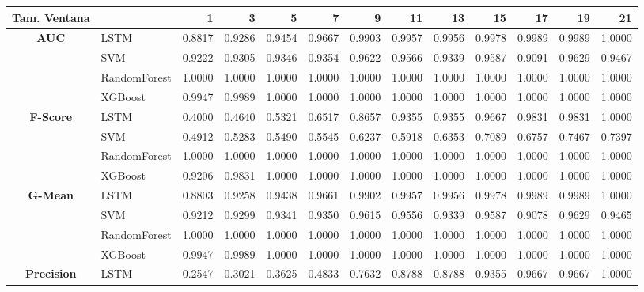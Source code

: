 \begin{table}[h]
\centering
\begin{adjustbox}{max width=15cm}
	\begin{tabular}{|c|l|r|r|r|r|r|r|r|r|r|r|r|}
		\hline
		\textbf{Tam. Ventana}&         &      1  &      3  &      5  &      7  &      9  &      11 &      13 &      15 &      17 &      19 &      21 \\
		\hline
		\textbf{AUC} & LSTM &  0.8817 &  0.9286 &  0.9454 &  0.9667 &  0.9903 &  0.9957 &  0.9956 &  0.9978 &  0.9989 &  0.9989 &  1.0000 \\
		& SVM &  0.9222 &  0.9305 &  0.9346 &  0.9354 &  0.9622 &  0.9566 &  0.9339 &  0.9587 &  0.9091 &  0.9629 &  0.9467 \\
		& RandomForest &  1.0000 &  1.0000 &  1.0000 &  1.0000 &  1.0000 &  1.0000 &  1.0000 &  1.0000 &  1.0000 &  1.0000 &  1.0000 \\
		& XGBoost &  0.9947 &  0.9989 &  1.0000 &  1.0000 &  1.0000 &  1.0000 &  1.0000 &  1.0000 &  1.0000 &  1.0000 &  1.0000 \\
		\hline
		\textbf{F-Score} & LSTM &  0.4000 &  0.4640 &  0.5321 &  0.6517 &  0.8657 &  0.9355 &  0.9355 &  0.9667 &  0.9831 &  0.9831 &  1.0000 \\
		& SVM &  0.4912 &  0.5283 &  0.5490 &  0.5545 &  0.6237 &  0.5918 &  0.6353 &  0.7089 &  0.6757 &  0.7467 &  0.7397 \\
		& RandomForest &  1.0000 &  1.0000 &  1.0000 &  1.0000 &  1.0000 &  1.0000 &  1.0000 &  1.0000 &  1.0000 &  1.0000 &  1.0000 \\
		& XGBoost &  0.9206 &  0.9831 &  1.0000 &  1.0000 &  1.0000 &  1.0000 &  1.0000 &  1.0000 &  1.0000 &  1.0000 &  1.0000 \\
		\hline
		\textbf{G-Mean} & LSTM &  0.8803 &  0.9258 &  0.9438 &  0.9661 &  0.9902 &  0.9957 &  0.9956 &  0.9978 &  0.9989 &  0.9989 &  1.0000 \\
		& SVM &  0.9212 &  0.9299 &  0.9341 &  0.9350 &  0.9615 &  0.9556 &  0.9339 &  0.9587 &  0.9078 &  0.9629 &  0.9465 \\
		& RandomForest &  1.0000 &  1.0000 &  1.0000 &  1.0000 &  1.0000 &  1.0000 &  1.0000 &  1.0000 &  1.0000 &  1.0000 &  1.0000 \\
		& XGBoost &  0.9947 &  0.9989 &  1.0000 &  1.0000 &  1.0000 &  1.0000 &  1.0000 &  1.0000 &  1.0000 &  1.0000 &  1.0000 \\
		\hline
		\textbf{Precision} & LSTM &  0.2547 &  0.3021 &  0.3625 &  0.4833 &  0.7632 &  0.8788 &  0.8788 &  0.9355 &  0.9667 &  0.9667 &  1.0000 \\

\end{tabular}
\end{adjustbox}
\end{table}
